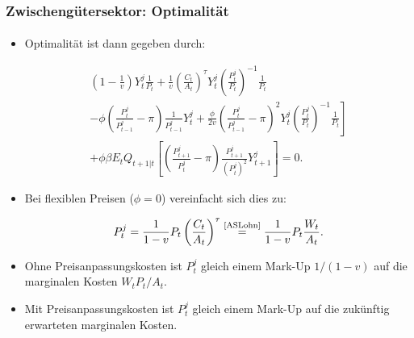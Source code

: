 \documentclass[10pt]{beamer}  %
\begin{document}
\begin{frame}\label{OptimZGS}
\frametitle{Zwischeng\"{u}tersektor: Optimalit\"{a}t}\framesubtitle{}
\begin{itemize}
\item Optimalit\"{a}t ist dann gegeben durch: \hyperlink{app:OptimZGS}{}
\begin{scriptsize}\begin{multline}\label{ASFOCZG}
\left(1-\frac{1}{v}\right)Y_t^j\frac{1}{P_t}
+\frac{1}{v} \left(\frac{C_t}{A_t}\right)^{\tau} Y_t^j\left(\frac{P_t^j}{P_{t}}\right)^{-1}\frac{1}{P_t}\\
\left.-\phi\left(\frac{P_{t}^j}{P_{t-1}^j}-\pi\right)\frac{1}{P_{t-1}^j}Y_t^j
+\frac{\phi}{2v}\left(\frac{P_{t}^j}{P_{t-1}^j}-\pi\right)^2 Y_t^j\left(\frac{P_t^j}{P_t}\right)^{-1} \frac{1}{P_t}\right]\\
+ \phi \beta E_t
Q_{t+1|t}\left[\left(\frac{P_{t+1}^j}{P_{t}^j}-\pi\right)\frac{P_{t+1}^j}{(P_t^j)^2}Y_{t+1}^j\right]=0.
\end{multline}\end{scriptsize}
\item Bei flexiblen Preisen ($\phi = 0$) vereinfacht sich dies zu:
\begin{scriptsize}\begin{align}\label{ASFlexiblePreis}
P_t^j= \frac{1}{1-v}
P_t\left(\frac{C_t}{A_t}\right)^\tau \overset{\text{\eqref{ASLohn}}}{=} \frac{1}{1-v}P_t \frac{W_t }{A_t}.
\end{align}\end{scriptsize}
\item Ohne Preisanpassungskosten ist $P_t^j$ gleich einem Mark-Up $1/(1-v)$ auf die marginalen Kosten $W_t P_t /A_t$.
\item Mit Preisanpassungskosten ist $P_t^j$ gleich einem Mark-Up auf die zuk\"{u}nftig erwarteten marginalen Kosten.
\end{itemize}
\end{frame}
\end{document}
